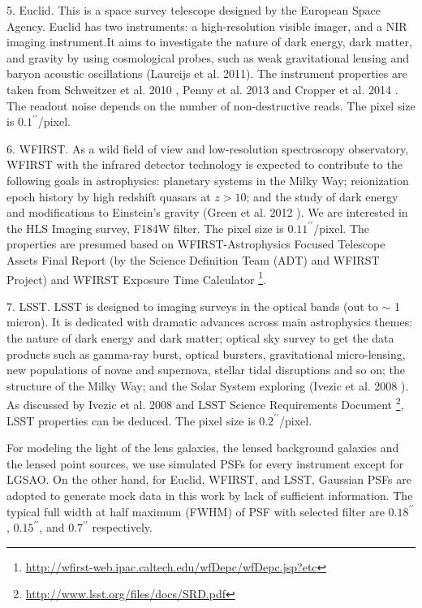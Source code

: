 \documentclass[a4paper,11pt]{article}
\begin{document}
\begin{enumerate}
    5. Euclid. This is a space survey telescope designed by the European Space Agency. Euclid has two instruments: a high-resolution visible imager, and a NIR imaging instrument.It aims to investigate the nature of dark energy, dark matter, and gravity by using cosmological probes, such as weak gravitational lensing and baryon acoustic oscillations (Laureijs et al. 2011). The instrument properties are taken from Schweitzer et al. 2010 \cite{2010SPIE.7731E..1KS}, Penny et al. 2013 \cite{2013MNRAS.434....2P} and Cropper et al. 2014 \cite{2014SPIE.9143E..0JC}. The readout noise depends on the number of non-destructive reads. The pixel size is $0.1^{\prime\prime}$/pixel.
    
    6. WFIRST. As a wild field of view and low-resolution spectroscopy observatory, WFIRST with the infrared detector technology is expected to contribute to the following goals in astrophysics: planetary systems in the Milky Way; reionization epoch history by high redshift quasars at $z>10$; and the study of dark energy and modifications to Einstein's gravity (Green et al. 2012 \cite{2012arXiv1208.4012G}). We are interested in the HLS Imaging survey, F184W filter. The pixel size is $0.11^{\prime\prime}$/pixel. The properties are presumed based on WFIRST-Astrophysics Focused Telescope Assets Final Report (by the Science Definition Team (ADT) and WFIRST Project) and WFIRST Exposure Time Calculator \footnote{\url{http://wfirst-web.ipac.caltech.edu/wfDepc/wfDepc.jsp?etc}}.
    
    7. LSST. LSST is designed to imaging surveys in the optical bands (out to $\sim$ 1 micron). It is dedicated with dramatic advances across main astrophysics themes: the nature of dark energy and dark matter; optical sky survey to get the data products such as gamma-ray burst, optical bursters, gravitational micro-lensing, new populations of novae and supernova, stellar tidal disruptions and so on; the structure of the Milky Way; and the Solar System exploring (Ivezic et al. 2008 \cite{2008arXiv0805.2366I}). As discussed by Ivezic et al. 2008 and LSST Science Requirements Document \footnote{\url{http://www.lsst.org/files/docs/SRD.pdf}}, LSST properties can be deduced. The pixel size is $0.2^{\prime\prime}$/pixel.

\end{enumerate}

For modeling the light of the lens galaxies, the lensed background galaxies and the lensed point sources,
we use simulated PSFs for every instrument except for LGSAO.
On the other hand, for Euclid, WFIRST, and LSST, Gaussian PSFs are adopted to generate mock data in this work by lack of sufficient information. The typical full width at half maximum (FWHM) of PSF with selected filter are $0.18^{\prime\prime}$, $0.15^{\prime\prime}$, and $0.7^{\prime\prime}$ respectively.
\end{document}

